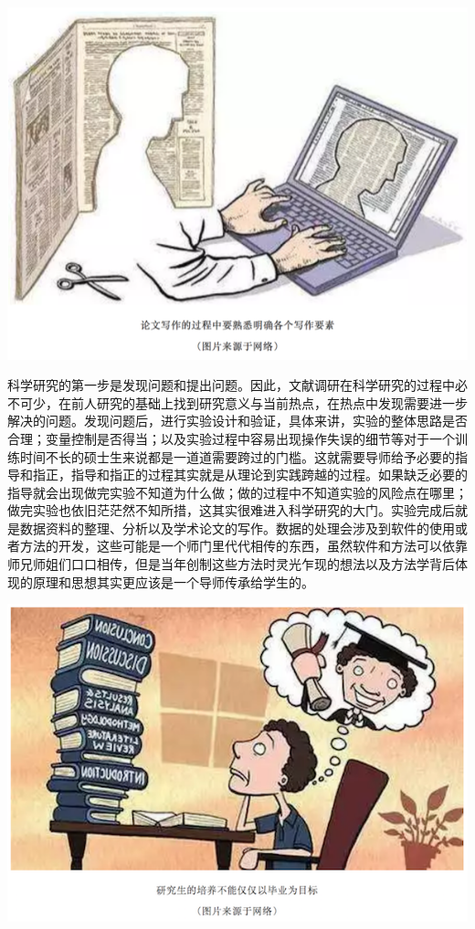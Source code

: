 \documentclass[]{book}
\begin{document}
\includegraphics[width=8.33in]{images/edit2}

科学研究的第一步是发现问题和提出问题。因此，文献调研在科学研究的过程中必不可少，在前人研究的基础上找到研究意义与当前热点，在热点中发现需要进一步解决的问题。发现问题后，进行实验设计和验证，具体来讲，实验的整体思路是否合理；变量控制是否得当；以及实验过程中容易出现操作失误的细节等对于一个训练时间不长的硕士生来说都是一道道需要跨过的门槛。这就需要导师给予必要的指导和指正，指导和指正的过程其实就是从理论到实践跨越的过程。如果缺乏必要的指导就会出现做完实验不知道为什么做；做的过程中不知道实验的风险点在哪里；做完实验也依旧茫茫然不知所措，这其实很难进入科学研究的大门。实验完成后就是数据资料的整理、分析以及学术论文的写作。数据的处理会涉及到软件的使用或者方法的开发，这些可能是一个师门里代代相传的东西，虽然软件和方法可以依靠师兄师姐们口口相传，但是当年创制这些方法时灵光乍现的想法以及方法学背后体现的原理和思想其实更应该是一个导师传承给学生的。

\includegraphics[width=8.33in]{images/edit3}
\end{document}
